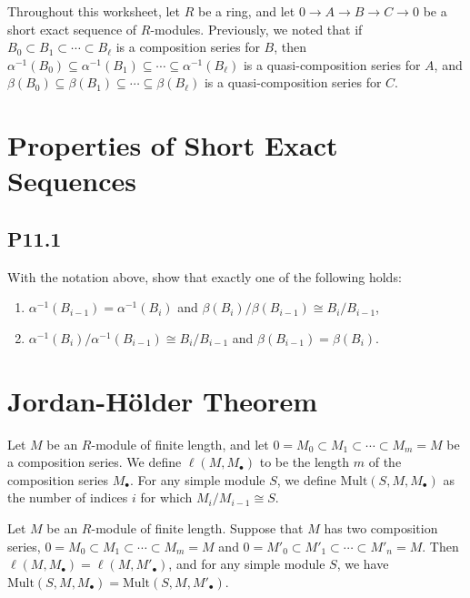 \documentclass[lang=cn,11pt]{template}
\begin{document}
Throughout this worksheet, let \( R \) be a ring, and let \( 0 \to A \to B \to C \to 0 \) be a short exact sequence of \( R \)-modules. Previously, we noted that if \( B_0 \subset B_1 \subset \cdots \subset B_\ell \) is a composition series for \( B \), then \( \alpha^{-1}(B_0) \subseteq \alpha^{-1}(B_1) \subseteq \cdots \subseteq \alpha^{-1}(B_\ell) \) is a quasi-composition series for \( A \), and \( \beta(B_0) \subseteq \beta(B_1) \subseteq \cdots \subseteq \beta(B_\ell) \) is a quasi-composition series for \( C \).

\section{Properties of Short Exact Sequences}

\subsection*{P11.1} With the notation above, show that exactly one of the following holds:
\begin{enumerate}
    \item \( \alpha^{-1}(B_{i-1}) = \alpha^{-1}(B_i) \) and \( \beta(B_i) / \beta(B_{i-1}) \cong B_i / B_{i-1} \),
    \item \( \alpha^{-1}(B_i) / \alpha^{-1}(B_{i-1}) \cong B_i / B_{i-1} \) and \( \beta(B_{i-1}) = \beta(B_i) \).
\end{enumerate}

\section{Jordan-Hölder Theorem}

\begin{definition}
Let \( M \) be an \( R \)-module of finite length, and let \( 0 = M_0 \subset M_1 \subset \cdots \subset M_m = M \) be a composition series. We define \( \ell(M, M_\bullet) \) to be the length \( m \) of the composition series \( M_\bullet \). For any simple module \( S \), we define \( \text{Mult}(S, M, M_\bullet) \) as the number of indices \( i \) for which \( M_i / M_{i-1} \cong S \).
\end{definition}

\begin{theorem}
Let \( M \) be an \( R \)-module of finite length. Suppose that \( M \) has two composition series, \( 0 = M_0 \subset M_1 \subset \cdots \subset M_m = M \) and \( 0 = M'_0 \subset M'_1 \subset \cdots \subset M'_n = M \). Then \( \ell(M, M_\bullet) = \ell(M, M'_\bullet) \), and for any simple module \( S \), we have \( \text{Mult}(S, M, M_\bullet) = \text{Mult}(S, M, M'_\bullet) \).
\end{theorem}
\end{document}
